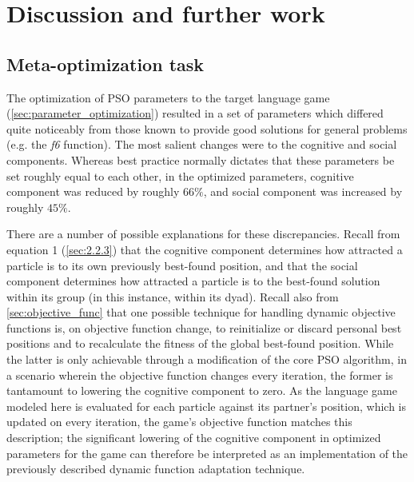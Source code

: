 \documentclass[12pt,a4paper]{article}
\begin{document}
\section{Discussion and further work}
\subsection{Meta-optimization task}
The optimization of PSO parameters to the target language game (\ref{sec:parameter_optimization}) resulted in a set of parameters which differed quite noticeably from those known to provide good solutions for general problems (e.g. the \textit{f6} function). The most salient changes were to the cognitive and social components. Whereas best practice normally dictates that these parameters be set roughly equal to each other, in the optimized parameters, cognitive component was reduced by roughly $66\%$, and social component was increased by roughly $45\%$. 

There are a number of possible explanations for these discrepancies. Recall from   
equation 1 (\ref{sec:2.2.3}) that the cognitive component determines how attracted a particle is to its own previously best-found position, and that the social component determines how attracted a particle is to the best-found solution within its group (in this instance, within its dyad). Recall also from \ref{sec:objective_func} that one possible technique for handling dynamic objective functions is, on objective function change, to reinitialize or discard personal best positions and to recalculate the fitness of the global best-found position. While the latter is only achievable through a modification of the core PSO algorithm, in a scenario wherein the objective function changes every iteration, the former is tantamount to lowering the cognitive component to zero. As the language game modeled here is evaluated for each particle against its partner's position, which is updated on every iteration, the game's objective function matches this description; the significant lowering of the cognitive component in optimized parameters for the game can therefore be interpreted as an implementation of the previously described dynamic function adaptation technique.
\end{document}
